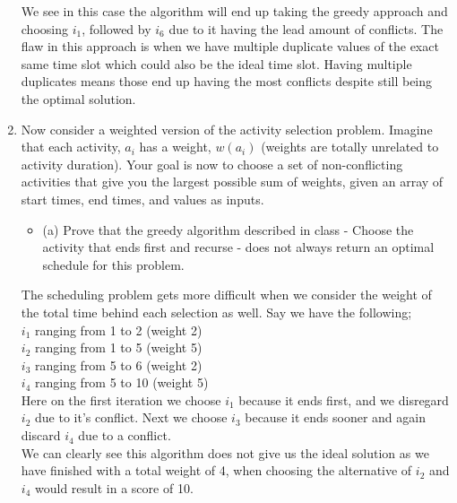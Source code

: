 \documentclass{article}
\begin{document}
\begin{enumerate}
We see in this case the algorithm will end up taking the greedy approach and choosing $i_1$, followed by $i_6$ due to it having the lead amount of conflicts. The flaw in this approach is when we have multiple duplicate values of the exact same time slot which could also be the ideal time slot. Having multiple duplicates means those end up having the most conflicts despite still being the optimal solution. 









\newpage
\item Now consider a weighted version of the activity selection problem. Imagine that each activity, $a_i$ has a weight, $w(a_i)$ (weights are totally unrelated to activity duration). Your goal is now to choose a set of non-conflicting activities that give you the largest possible sum of weights, given an array of start times, end times, and values as inputs. 
\begin{itemize}
    \item (a) Prove that the greedy algorithm described in class - Choose the activity that ends first and recurse - does not always return an optimal schedule for this problem. 
\end{itemize}
The scheduling problem gets more difficult when we consider the weight of the total time behind each selection as well. Say we have the following; \\
\newline 
$i_1$ ranging from 1 to 2 (weight 2) \\
$i_2$ ranging from 1 to 5 (weight 5) \\
$i_3$ ranging from 5 to 6 (weight 2) \\
$i_4$ ranging from 5 to 10 (weight 5) \\
\newline 
Here on the first iteration we choose $i_1$ because it ends first, and we disregard $i_2$ due to it's conflict. Next we choose $i_3$ because it ends sooner and again discard $i_4$ due to a conflict. \\
\newline 
We can clearly see this algorithm does not give us the ideal solution as we have finished with a total weight of 4, when choosing the alternative of $i_2$ and $i_4$ would result in a score of 10. \\
\newline







\end{enumerate}
\end{document}
